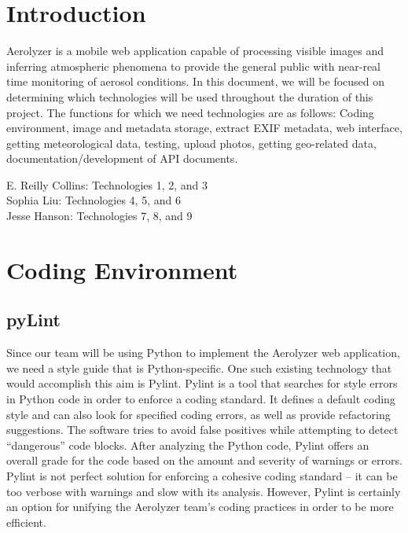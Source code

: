 \documentclass[letterpaper,10pt,draftclsnofoot,onecolumn]{IEEEtran}
\begin{document}
\begin{flushleft}

\tableofcontents
\clearpage

\listoftables
\clearpage

\section{Introduction}

Aerolyzer is a mobile web application capable of processing visible images and inferring atmospheric phenomena to provide the general public with near-real time monitoring of aerosol conditions. In this document, we will be focused on determining which technologies will be used throughout the duration of this project. The functions for which we need technologies are as follows: Coding environment, image and metadata storage, extract EXIF metadata, web interface, getting meteorological data, testing, upload photos, getting geo-related data, documentation/development of API documents.\\

\medskip

E. Reilly Collins: Technologies 1, 2, and 3 \\
Sophia Liu: Technologies 4, 5, and 6 \\
Jesse Hanson: Technologies 7, 8, and 9


\section{Coding Environment}
\subsection{pyLint}
Since our team will be using Python to implement the Aerolyzer web application, we need a style guide that is Python-specific.
One such existing technology that would accomplish this aim is Pylint. Pylint is a tool that searches for style errors in Python code in order to enforce a coding standard. \cite{1}
It defines a default coding style and can also look for specified coding errors, as well as provide refactoring suggestions. 
The software tries to avoid false positives while attempting to detect “dangerous” code blocks. 
After analyzing the Python code, Pylint offers an overall grade for the code based on the amount and severity of warnings or errors. 
Pylint is not perfect solution for enforcing a cohesive coding standard – it can be too verbose with warnings and slow with its analysis. \cite{2} 
However, Pylint is certainly an option for unifying the Aerolyzer team’s coding practices in order to be more efficient. 



\end{flushleft}
\end{document}
